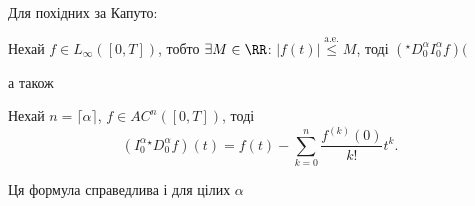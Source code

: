Для похідних за Капуто:
\begin{theorem}
    Нехай $f \in L_\infty([0,T])$, тобто $\exists M \in \RR$: $|f(t)| \overset{\text{a.e.}}{\le} M$, тоді $({}^\star D_0^\alpha I_0^\alpha f)($
\end{theorem}
а також
\begin{theorem}
    Нехай $n = \lceil \alpha \rceil$, $f \in AC^n([0,T])$, тоді
    \begin{equation}
        (I_0^\alpha {}^\star D_0^\alpha f)(t) = f(t) - \sum_{k = 0}^n \frac{f^{(k)}(0)}{k!} t^k.
    \end{equation}
\end{theorem}
\begin{remark}
    Ця формула справедлива і для цілих $\alpha$
\end{remark}

